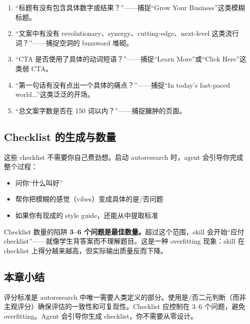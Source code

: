 \begin{enumerate}
    \item ``标题有没有包含具体数字或结果？''——捕捉``Grow Your Business''这类模糊标题。
    \item ``文案中有没有 revolutionary、synergy、cutting-edge、next-level 这类流行词？''——捕捉空洞的 buzzword 堆砌。
    \item ``CTA 是否使用了具体的动词短语？''——捕捉``Learn More''或``Click Here''这类弱 CTA。
    \item ``第一句话有没有点出一个具体的痛点？''——捕捉``In today's fast-paced world...''这类泛泛的开场。
    \item ``总文案字数是否在 150 词以内？''——捕捉臃肿的页面。
\end{enumerate}

\subsection{Checklist 的生成与数量}

这些 checklist 不需要你自己费劲想。启动 autoresearch 时，agent 会引导你完成整个过程：

\begin{itemize}
    \item 问你``什么叫好''
    \item 帮你把模糊的感觉（vibes）变成具体的是/否问题
    \item 如果你有现成的 style guide，还能从中提取标准
\end{itemize}

\begin{warningbox}{Checklist 数量的陷阱}
\textbf{3--6 个问题是最佳数量。}超过这个范围，skill 会开始``应付 checklist''——就像学生背答案而不理解题目。这是一种 overfitting 现象：skill 在 checklist 上得分越来越高，但实际输出质量反而下降。
\end{warningbox}

\subsection{本章小结}

评分标准是 autoresearch 中唯一需要人类定义的部分。使用是/否二元判断（而非主观评分）确保评估的一致性和可复现性。Checklist 应控制在 3--6 个问题，避免 overfitting。Agent 会引导你生成 checklist，你不需要从零设计。

